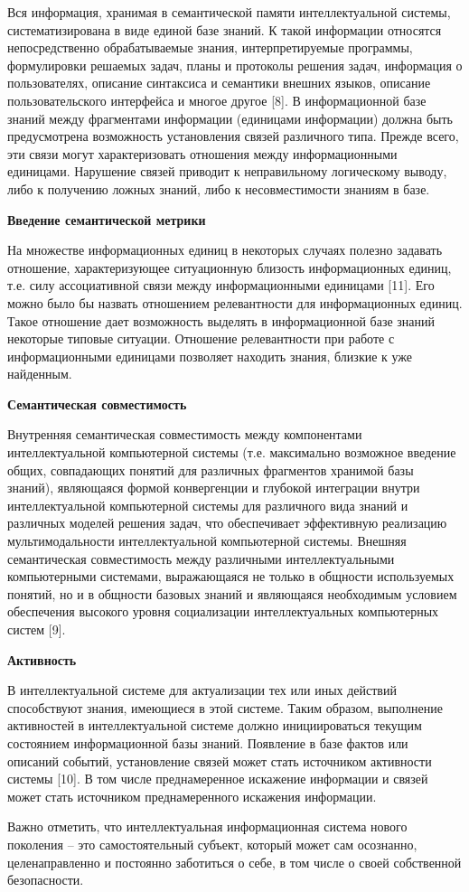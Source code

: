 Вся информация, хранимая в семантической памяти интеллектуальной системы, систематизирована в виде единой базе знаний. К такой информации относятся непосредственно обрабатываемые знания, интерпретируемые программы, формулировки решаемых задач, планы и протоколы решения задач, информация о пользователях, описание синтаксиса и семантики внешних языков, описание пользовательского интерфейса и многое другое {[}8{]}. В информационной базе знаний между фрагментами информации (единицами информации) должна быть предусмотрена возможность установления связей различного типа. Прежде всего, эти связи могут характеризовать отношения между информационными единицами. Нарушение связей приводит к неправильному логическому выводу, либо к получению ложных знаний, либо к несовместимости знаниям в базе.

\textbf{Введение семантической метрики}

На множестве информационных единиц в некоторых случаях полезно задавать отношение, характеризующее ситуационную близость информационных единиц, т.е. силу ассоциативной связи между информационными единицами {[}11{]}. Его можно было бы назвать отношением релевантности для информационных единиц. Такое отношение дает возможность выделять в информационной базе знаний некоторые типовые ситуации. Отношение релевантности при работе с информационными единицами позволяет находить знания, близкие к уже найденным.

\textbf{Семантическая совместимость}

Внутренняя семантическая совместимость между компонентами интеллектуальной компьютерной системы (т.е. максимально возможное введение общих, совпадающих понятий для различных фрагментов хранимой базы знаний), являющаяся формой конвергенции и глубокой интеграции внутри интеллектуальной компьютерной системы для различного вида знаний и различных моделей решения задач, что обеспечивает эффективную реализацию мультимодальности интеллектуальной компьютерной системы. Внешняя семантическая совместимость между различными интеллектуальными компьютерными системами, выражающаяся не только в общности используемых понятий, но и в общности базовых знаний и являющаяся необходимым условием обеспечения высокого уровня социализации интеллектуальных компьютерных систем {[}9{]}.

\textbf{Активность}

В интеллектуальной системе для актуализации тех или иных действий способствуют знания, имеющиеся в этой системе. Таким образом, выполнение активностей в интеллектуальной системе должно инициироваться текущим состоянием информационной базы знаний. Появление в базе фактов или описаний событий, установление связей может стать источником активности системы {[}10{]}. В том числе преднамеренное искажение информации и связей может стать источником преднамеренного искажения информации.

Важно отметить, что интеллектуальная информационная система нового поколения -- это самостоятельный субъект, который может сам осознанно, целенаправленно и постоянно заботиться о себе, в том числе о своей собственной безопасности.


%